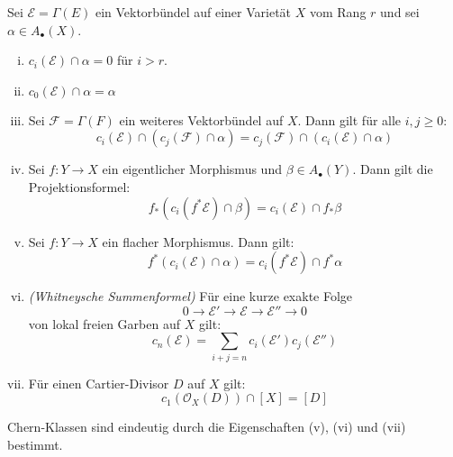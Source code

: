 \documentclass[10pt,b5paper]{article}
\begin{document}
\begin{proposition}
Sei $\mathcal{E} = \Gamma(E)$ ein Vektorbündel auf einer Varietät $X$ vom Rang $r$ und sei $\alpha\in A_\bullet(X)$.
\begin{enumerate}[(i)]
\item $c_i(\mathcal{E})\cap \alpha = 0$ für $i > r$.
\item $c_0(\mathcal{E})\cap \alpha = \alpha$
\item Sei $\mathcal{F} = \Gamma(F)$ ein weiteres Vektorbündel auf $X$. Dann gilt für alle $i,j\geq 0$:
\[ c_i(\mathcal{E})\cap (c_j(\mathcal{F}) \cap \alpha) = c_j(\mathcal{F}) \cap (c_i(\mathcal{E})\cap \alpha) \]
\item Sei $f:Y\to X$ ein eigentlicher Morphismus und $\beta\in A_\bullet(Y)$. Dann gilt die Projektionsformel:
\[ f_\ast(c_i(f^\ast\mathcal{E})\cap\beta) = c_i(\mathcal{E})\cap f_\ast\beta \]
\item Sei $f:Y\to X$ ein flacher Morphismus. Dann gilt:
\[ f^\ast(c_i(\mathcal{E})\cap \alpha) = c_i(f^\ast\mathcal{E})\cap f^\ast\alpha \]
\item \textit{(Whitneysche Summenformel)} Für eine kurze exakte Folge 
\[ 0\longrightarrow\mathcal{E}'\longrightarrow\mathcal{E}\longrightarrow \mathcal{E}''\longrightarrow 0 \]
von lokal freien Garben auf $X$ gilt:
\[ c_n(\mathcal{E}) = \sum_{i+j = n}c_i(\mathcal{E}')c_j(\mathcal{E}'') \]
\item Für einen Cartier-Divisor $D$ auf $X$ gilt:
\[ c_1(\mathcal{O}_X(D))\cap [X] = [D] \]
\end{enumerate}
\end{proposition}

\begin{remark}
Chern-Klassen sind eindeutig durch die Eigenschaften (v), (vi) und (vii) bestimmt.
\end{remark}
\end{document}
